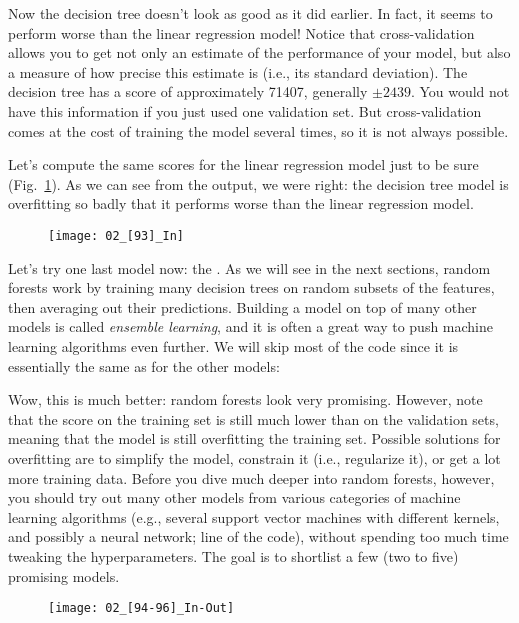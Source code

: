 Now the decision tree doesn't look as good as it did earlier. In fact, it seems to perform worse than the linear regression model! Notice that cross-validation allows you to get not only an estimate of the performance of your
model, but also a measure of how precise this estimate is (i.e., its standard deviation). The decision tree has a score of approximately \num{71407}, generally $\pm\num{2439}$. You would not have this information if you just used one validation set. But cross-validation comes at the cost of training the model several times, so it is not always possible.

Let's compute the same scores for the linear regression model just to be sure (Fig.~\ref{02_[93]_In}). As we can see from the output, we were right: the decision tree model is overfitting so badly that it performs worse than the linear regression model.
\begin{figure}[h!t]
\centering
\texttt{[image: 02\_[93]\_In]}
\caption{}\label{02_[93]_In}
\end{figure}

Let's try one last model now: the . As we will see in the next sections, random forests work by training many decision trees on random subsets of the features, then averaging out their predictions. Building a model on top of many other models is called \emph{ensemble learning}, and it is often a great way to push machine learning algorithms even further. We will skip most of the code since it is essentially the same as for the other models:

Wow, this is much better: random forests look very promising. However, note that the score on the training set is still much lower than on the validation sets, meaning that the model is still overfitting the training set. Possible solutions for overfitting are to simplify the model, constrain it (i.e., regularize it), or get a lot more training data. Before you dive much deeper into random forests, however, you should try out many other models from various categories of machine learning algorithms (e.g., several support vector machines with different kernels, and possibly a neural network; line  of the code), without spending too much time tweaking the hyperparameters. The goal is to shortlist a few (two to five) promising models.
\begin{figure}[h!t]
\centering
\texttt{[image: 02\_[94-96]\_In-Out]}
\caption{}\label{02_[94-96]_In-Out}
\end{figure}
